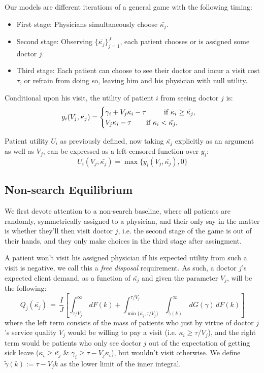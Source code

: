 \documentclass{article}
\begin{document}
Our models are different iterations of a general game with the following timing:
\begin{itemize}
    \item First stage: Physicians simultaneously choose $\bar{\kappa_j}$.
    \item Second stage: Observing $\{\bar{\kappa_j}\}_{j =1}^{J}$, each patient chooses or is assigned some doctor $j$.
    \item Third stage: Each patient can choose to see their doctor and incur a visit cost $\tau$, or refrain from doing so, leaving him and his physician with null utility.
\end{itemize}

Conditional upon his visit, the utility of patient $i$ from seeing doctor $j$ is:
\[
    y_i(V_j,\bar{\kappa_j}) =\begin{cases}
    \gamma_i + V_j \kappa_i - \tau \text{  \hspace{0.65cm} if $\kappa_i \geq \bar{\kappa_j}$,} \\
    V_j \kappa_i - \tau \text{  \hspace{0.5cm} if $\kappa_i < \bar{\kappa_j}$,}
    \end{cases}
\]

Patient utility $U_i$ as previously defined, now taking $\bar{\kappa_j}$ explicitly as an argument as well as $V_j$, can be expressed as a left-censored function over $y_i$:
\[
U_i(V_j,\bar{\kappa_j}) =  \operatorname{max} \{y_i(V_j,\bar{\kappa_j}),0\}
\]

\subsection{Non-search Equilibrium}

We first devote attention to a non-search baseline, where all patients are randomly, symmetrically assigned to a physician, and their only say in the matter is whether they’ll then visit doctor $j$, i.e. the second stage of the game is out of their hands, and they only make choices in the third stage after assingment.

A patient won’t visit his assigned physician if his expected utility from such a visit is negative, we call this a \textit{free disposal} requirement. As such, a doctor $j$’s expected client demand, as a function of $\bar{\kappa_j}$ and given the parameter $V_j$, will be the following:
\begin{equation}
    Q_j(\bar{\kappa_j}) \,=\, \frac{I}{J}\left[ \int_{\tau/V_j}^{\infty}\,dF(k) +  \int_{\min\{\bar{\kappa_j},\tau/V_j\}}^{\tau/V_j} \int_{\tilde{\gamma}(k)}^{\infty} \,dG(\gamma) \,dF(k) \right] \tag{N.1}\label{eq:ns_Q}
    \end{equation}
where the left term consists of the mass of patients who just by virtue of doctor $j$’s service quality $V_j$ would be willing to pay a visit (i.e. $\kappa_i \geq \tau/V_j$), and the right term would be patients who only see doctor $j$ out of the expectation of getting sick leave ($\kappa_i \geq \bar{\kappa_j}$ \& $\gamma_i \geq \tau - V_j \kappa_i$), but wouldn’t visit otherwise. We define $\tilde{\gamma}(k) := \tau - V_j k$ as the lower limit of the inner integral.
\end{document}

